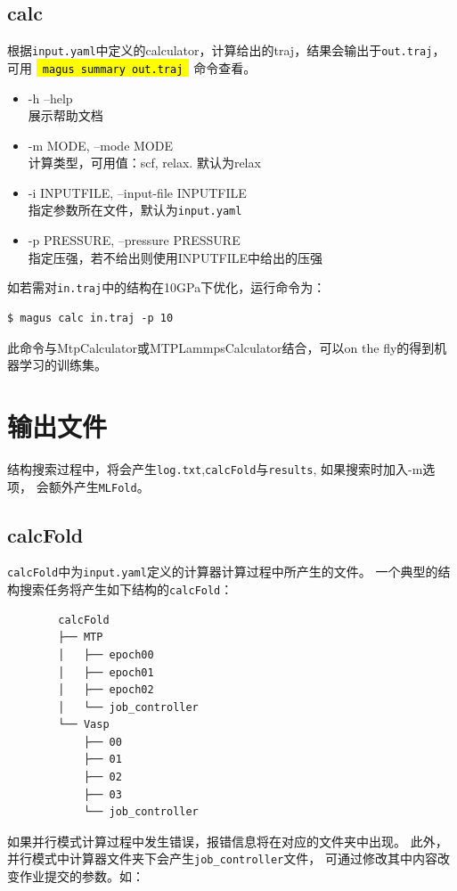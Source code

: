 \documentclass[12pt]{article}
\newcommand{\code}[1]{
  \begingroup
  \sethlcolor{Seashell}
  {\hl{\texttt{~#1~}}}
  \endgroup
}
\newcommand{\file}[1]{\texttt{#1}}
\begin{document}
\subsection{calc} \label{calc}
根据\file{input.yaml}中定义的calculator，计算给出的traj，结果会输出于\file{out.traj}，
可用\code{magus summary out.traj}命令查看。
\begin{itemize}
    \item -h --help \\
    展示帮助文档
    \item -m MODE, --mode MODE \\
    计算类型，可用值：scf, relax. 默认为relax
    \item -i INPUTFILE, --input-file INPUTFILE  \\    
    指定参数所在文件，默认为\file{input.yaml}
    \item -p PRESSURE, --pressure PRESSURE \\ 
    指定压强，若不给出则使用INPUTFILE中给出的压强
\end{itemize}
如若需对\file{in.traj}中的结构在10GPa下优化，运行命令为：
\begin{tcolorbox}
    \begin{verbatim} 
$ magus calc in.traj -p 10
    \end{verbatim}
\end{tcolorbox}
此命令与MtpCalculator或MTPLammpsCalculator结合，可以on the fly的得到机器学习的训练集。
\newpage
\section{输出文件}
结构搜索过程中，将会产生\file{log.txt},\file{calcFold}与\file{results}, 如果搜索时加入-m选项，
会额外产生\file{MLFold}。
\subsection{calcFold}
\file{calcFold}中为\file{input.yaml}定义的计算器计算过程中所产生的文件。
一个典型的结构搜索任务将产生如下结构的\file{calcFold}：

\begin{verbatim}
        calcFold
        ├── MTP
        │   ├── epoch00
        │   ├── epoch01
        │   ├── epoch02
        │   └── job_controller
        └── Vasp
            ├── 00
            ├── 01
            ├── 02
            ├── 03
            └── job_controller
\end{verbatim}
\par
如果并行模式计算过程中发生错误，报错信息将在对应的文件夹中出现。
此外，并行模式中计算器文件夹下会产生\file{job\_controller}文件，
可通过修改其中内容改变作业提交的参数。如：
\end{document}
